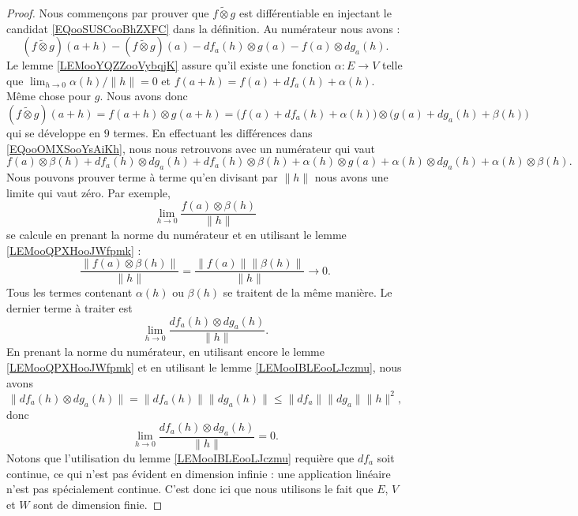 \begin{proof}
	Nous commençons par prouver que \( f\tilde\otimes g\) est différentiable en injectant le candidat \eqref{EQooSUSCooBhZXFC} dans la définition. Au numérateur nous avons :
	\begin{equation}        \label{EQooOMXSooYsAiKh}
		(f\tilde\otimes g)(a+h)-(f\tilde\otimes g)(a)-df_a(h)\otimes g(a)-f(a)\otimes dg_a(h).
	\end{equation}
	Le lemme \ref{LEMooYQZZooVybqjK} assure qu'il existe une fonction \( \alpha\colon E\to V\) telle que \( \lim_{h\to 0} \alpha(h)/\| h \|=0\) et \( f(a+h)=f(a)+df_a(h)+\alpha(h)\). Même chose pour \( g\). Nous avons donc
	\begin{equation}
		(f\tilde\otimes g)(a+h)=f(a+h)\otimes g(a+h)=\big( f(a)+df_a(h)+\alpha(h) \big)\otimes \big( g(a)+dg_a(h)+\beta(h) \big)
	\end{equation}
	qui se développe en \( 9\) termes. En effectuant les différences dans \eqref{EQooOMXSooYsAiKh}, nous nous retrouvons avec un numérateur qui vaut
	\begin{equation}
		f(a)\otimes \beta(h)+df_a(h)\otimes dg_a(h)+df_a(h)\otimes \beta(h)+\alpha(h)\otimes g(a)+\alpha(h)\otimes dg_a(h)+\alpha(h)\otimes \beta(h).
	\end{equation}
	Nous pouvons prouver terme à terme qu'en divisant par \( \| h \|\) nous avons une limite qui vaut zéro. Par exemple,
	\begin{equation}
		\lim_{h\to 0} \frac{ f(a)\otimes \beta(h) }{ \| h \| }
	\end{equation}
	se calcule en prenant la norme du numérateur et en utilisant le lemme \ref{LEMooQPXHooJWfpmk} :
	\begin{equation}
		\frac{ \| f(a)\otimes \beta(h) \| }{ \| h \| }=\frac{ \| f(a) \|\| \beta(h) \| }{ \| h \| }\to 0.
	\end{equation}
	Tous les termes contenant \( \alpha(h)\) ou \( \beta(h)\) se traitent de la même manière. Le dernier terme à traiter est
	\begin{equation}
		\lim_{h\to 0} \frac{ df_a(h)\otimes dg_a(h) }{ \| h \| }.
	\end{equation}
	En prenant la norme du numérateur, en utilisant encore le lemme \ref{LEMooQPXHooJWfpmk} et en utilisant le lemme \ref{LEMooIBLEooLJczmu}, nous avons
	\begin{equation}
		\| df_a(h)\otimes dg_a(h) \|=\| df_a(h) \|\| dg_a(h) \|\leq \| df_a \|\| dg_a \|\| h \|^2,
	\end{equation}
	donc
	\begin{equation}
		\lim_{h\to 0} \frac{ df_a(h)\otimes dg_a(h) }{ \| h \| }=0.
	\end{equation}
	Notons que l'utilisation du lemme \ref{LEMooIBLEooLJczmu} requière que \( df_a\) soit continue, ce qui n'est pas évident en dimension infinie : une application linéaire n'est pas spécialement continue. C'est donc ici que nous utilisons le fait que \( E\), \( V\) et \( W\) sont de dimension finie.


\end{proof}
